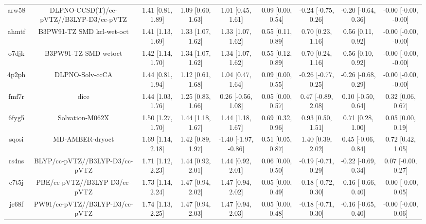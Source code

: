 \documentclass{article}
\begin{document}
\begin{center}
\begin{longtable}{|ccccccccc|}
 arw58 &            DLPNO-CCSD(T)/cc-pVTZ//B3LYP-D3/cc-pVTZ &  1.41 [0.81, 1.89] &  1.09 [0.60, 1.63] &     1.01 [0.45, 1.61] &  0.09 [0.00, 0.54] &  -0.24 [-0.75, 0.26] &  -0.20 [-0.64, 0.36] &  -0.00 [-0.00, -0.00] \\
 ahmtf &                          B3PW91-TZ SMD kcl-wet-oct &  1.41 [1.13, 1.69] &  1.33 [1.07, 1.62] &     1.33 [1.07, 1.62] &  0.55 [0.11, 0.89] &    0.70 [0.23, 1.16] &    0.56 [0.11, 0.92] &  -0.00 [-0.00, -0.00] \\
 o7djk &                               B3PW91-TZ SMD wetoct &  1.42 [1.14, 1.70] &  1.34 [1.07, 1.62] &     1.34 [1.07, 1.62] &  0.55 [0.12, 0.89] &    0.70 [0.24, 1.16] &    0.56 [0.10, 0.92] &  -0.00 [-0.00, -0.00] \\
 4p2ph &                                    DLPNO-Solv-ccCA &  1.44 [0.81, 1.94] &  1.12 [0.61, 1.68] &     1.04 [0.47, 1.64] &  0.09 [0.00, 0.55] &  -0.26 [-0.77, 0.25] &  -0.26 [-0.68, 0.29] &  -0.00 [-0.00, -0.00] \\
 fmf7r &                                               dice &  1.44 [1.03, 1.76] &  1.25 [0.83, 1.66] &    0.26 [-0.56, 1.08] &  0.05 [0.00, 0.57] &   0.47 [-0.89, 2.08] &   0.10 [-0.50, 0.64] &     0.32 [0.06, 0.67] \\
 6fyg5 &                                    Solvation-M062X &  1.50 [1.27, 1.70] &  1.44 [1.18, 1.67] &     1.44 [1.18, 1.67] &  0.69 [0.32, 0.96] &    0.93 [0.50, 1.51] &    0.71 [0.28, 1.00] &     0.05 [0.00, 0.19] \\
 sqosi &                                    MD-AMBER-dryoct &  1.69 [1.14, 2.18] &  1.42 [0.89, 1.97] &  -1.40 [-1.97, -0.86] &  0.51 [0.05, 0.87] &    1.40 [0.39, 2.02] &   0.45 [-0.06, 0.84] &     0.72 [0.42, 1.05] \\
 rs4ns &                     BLYP/cc-pVTZ//B3LYP-D3/cc-pVTZ &  1.71 [1.12, 2.23] &  1.44 [0.92, 2.01] &     1.44 [0.92, 2.01] &  0.06 [0.00, 0.50] &  -0.19 [-0.71, 0.29] &  -0.22 [-0.69, 0.34] &    0.07 [-0.00, 0.27] \\
 c7t5j &                      PBE/cc-pVTZ//B3LYP-D3/cc-pVTZ &  1.73 [1.14, 2.24] &  1.47 [0.94, 2.02] &     1.47 [0.94, 2.02] &  0.05 [0.00, 0.49] &  -0.18 [-0.72, 0.30] &  -0.16 [-0.66, 0.40] &   -0.00 [-0.00, 0.05] \\
 jc68f &                     PW91/cc-pVTZ//B3LYP-D3/cc-pVTZ &  1.74 [1.13, 2.25] &  1.47 [0.94, 2.03] &     1.47 [0.94, 2.03] &  0.05 [0.00, 0.48] &  -0.18 [-0.71, 0.30] &  -0.16 [-0.65, 0.40] &   -0.00 [-0.00, 0.06] \\

\end{longtable}
\end{center}
\end{document}
